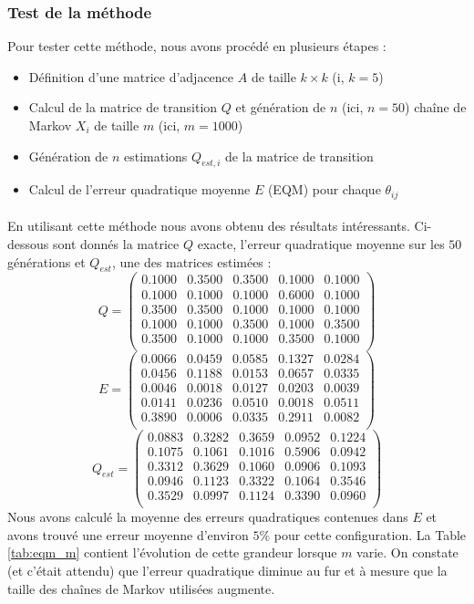 \documentclass[a4paper,titlepage]{report}
\begin{document}
\subsubsection{Test de la méthode}
\label{test_de_la_methode}
Pour tester cette méthode, nous avons procédé en plusieurs étapes : 
\begin{itemize}
	\item Définition d'une matrice d'adjacence $A$ de taille $k \times k$ (i, $k = 5$)
	\item Calcul de la matrice de transition $Q$ et génération de $n$ (ici, $n = 50$) chaîne de Markov $X_i$ de taille $m$ (ici, $m = 1000$)
	\item Génération de $n$ estimations $Q_{est,i}$ de la matrice de transition
	\item Calcul de l'erreur quadratique moyenne $E$ (EQM) pour chaque $\theta_{ij}$ 
\end{itemize}
\paragraph{}
En utilisant cette méthode nous avons obtenu des résultats intéressants. Ci-dessous sont donnés la matrice $Q$ exacte, l'erreur quadratique moyenne sur les $50$ générations et $Q_{est}$, une des matrices estimées :
\[
Q = 
\begin{pmatrix}
0.1000 & 0.3500 & 0.3500 & 0.1000 & 0.1000\\
0.1000 & 0.1000 & 0.1000 & 0.6000 & 0.1000\\
0.3500 & 0.3500 & 0.1000 & 0.1000 & 0.1000\\
0.1000 & 0.1000 & 0.3500 & 0.1000 & 0.3500\\
0.3500 & 0.1000 & 0.1000 & 0.3500 & 0.1000\\
\end{pmatrix}
\]
\[
E = 
\begin{pmatrix}
0.0066 & 0.0459 & 0.0585 & 0.1327 & 0.0284 \\
0.0456 & 0.1188 & 0.0153 & 0.0657 & 0.0335 \\
0.0046 & 0.0018 & 0.0127 & 0.0203 & 0.0039 \\
0.0141 & 0.0236 & 0.0510 & 0.0018 & 0.0511 \\
0.3890 & 0.0006 & 0.0335 & 0.2911 & 0.0082 \\
\end{pmatrix}
\]
\[
Q_{est} = 
\begin{pmatrix}
0.0883 & 0.3282 & 0.3659 & 0.0952 & 0.1224\\
0.1075 & 0.1061 & 0.1016 & 0.5906 & 0.0942\\
0.3312 & 0.3629 & 0.1060 & 0.0906 & 0.1093\\
0.0946 & 0.1123 & 0.3322 & 0.1064 & 0.3546\\
0.3529 & 0.0997 & 0.1124 & 0.3390 & 0.0960\\
\end{pmatrix}
\]
Nous avons calculé la moyenne des erreurs quadratiques contenues dans $E$ et avons trouvé une erreur moyenne d'environ $5\%$ pour cette configuration. La Table \ref{tab:eqm_m} contient l'évolution de cette grandeur lorsque $m$ varie. On constate (et c'était attendu) que l'erreur quadratique diminue au fur et à mesure que la taille des chaînes de Markov utilisées augmente.
\end{document}
